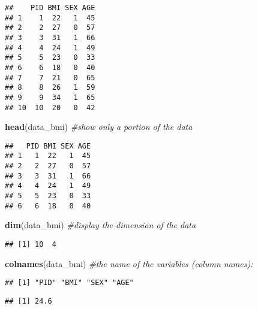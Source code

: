 \documentclass[]{article}
\newenvironment{Shaded}{\begin{snugshade}}{\end{snugshade}}
\newcommand{\CommentTok}[1]{\textcolor[rgb]{0.56,0.35,0.01}{\textit{#1}}}
\newcommand{\KeywordTok}[1]{\textcolor[rgb]{0.13,0.29,0.53}{\textbf{#1}}}
\newcommand{\NormalTok}[1]{#1}
\newcommand{\OperatorTok}[1]{\textcolor[rgb]{0.81,0.36,0.00}{\textbf{#1}}}
\begin{document}
\begin{verbatim}
##    PID BMI SEX AGE
## 1    1  22   1  45
## 2    2  27   0  57
## 3    3  31   1  66
## 4    4  24   1  49
## 5    5  23   0  33
## 6    6  18   0  40
## 7    7  21   0  65
## 8    8  26   1  59
## 9    9  34   1  65
## 10  10  20   0  42
\end{verbatim}

\begin{Shaded}
\begin{Highlighting}[]
\KeywordTok{head}\NormalTok{(data_bmi) }\CommentTok{#show only a portion of the data}
\end{Highlighting}
\end{Shaded}

\begin{verbatim}
##   PID BMI SEX AGE
## 1   1  22   1  45
## 2   2  27   0  57
## 3   3  31   1  66
## 4   4  24   1  49
## 5   5  23   0  33
## 6   6  18   0  40
\end{verbatim}

\begin{Shaded}
\begin{Highlighting}[]
\KeywordTok{dim}\NormalTok{(data_bmi) }\CommentTok{#display the dimension of the data}
\end{Highlighting}
\end{Shaded}

\begin{verbatim}
## [1] 10  4
\end{verbatim}

\begin{Shaded}
\begin{Highlighting}[]
\KeywordTok{colnames}\NormalTok{(data_bmi) }\CommentTok{#the name of the variables (column names):}
\end{Highlighting}
\end{Shaded}

\begin{verbatim}
## [1] "PID" "BMI" "SEX" "AGE"
\end{verbatim}

\begin{Shaded}
\end{Shaded}

\begin{verbatim}
## [1] 24.6
\end{verbatim}
\end{document}
